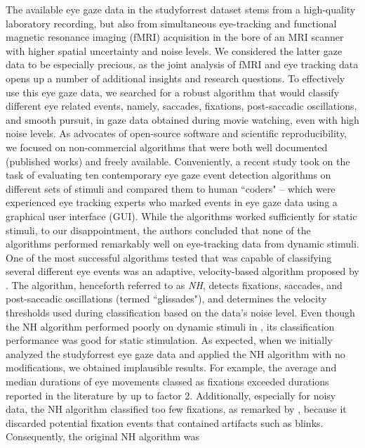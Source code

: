 The available eye gaze data in the studyforrest dataset stems from a high-quality laboratory recording, but also
from simultaneous eye-tracking and functional magnetic resonance imaging (fMRI) acquisition in the bore of an MRI
scanner with higher spatial uncertainty and noise levels. We considered the latter gaze data to be especially precious,
as the joint analysis of fMRI and eye tracking data opens up a number of additional insights and research
questions. To effectively use this eye gaze data, we searched for a robust algorithm that would classify
different eye related events, namely, saccades, fixations, post-saccadic oscillations, and smooth pursuit, in gaze
data obtained during movie watching, even with high noise levels. As advocates of open-source software and
scientific reproducibility, we focused on non-commercial algorithms that were both well documented (published
works) and freely available. Conveniently, a recent study \citep{Andersson2017} took on the task of evaluating
ten contemporary eye gaze event detection algorithms on  different sets of stimuli and compared them to human
``coders" -- which were experienced eye tracking experts who marked events in eye gaze data using a graphical
user interface (GUI). While the algorithms worked sufficiently for static stimuli, to our disappointment, the
authors concluded that none of the algorithms performed remarkably well on eye-tracking data from dynamic stimuli.
One of the most successful algorithms tested that was capable of classifying several different eye
events was an adaptive, velocity-based algorithm proposed by \citet{Nystrom2010AnData}.
The algorithm, henceforth referred to as \textit{NH}, detects fixations, saccades, and post-saccadic
oscillations (termed ``glissades"), and determines the velocity thresholds used during classification based on the
data's noise level. Even though the NH algorithm performed poorly on dynamic stimuli in \citet{Andersson2017}, its
classification performance was good for static stimulation. As expected, when we initially analyzed the
studyforrest eye gaze data and applied the NH algorithm with no modifications, we obtained implausible results.
For example, the average and median durations of eye movements  classed as fixations exceeded durations  reported in
the literature \citep{holmqvist2011eye,dorr2010variability} by up to factor 2. Additionally, especially for noisy
data, the NH algorithm classified too few fixations, as remarked by \citet{Friedman2018}, because it discarded
potential fixation events that contained artifacts such as blinks. Consequently, the original NH algorithm was
